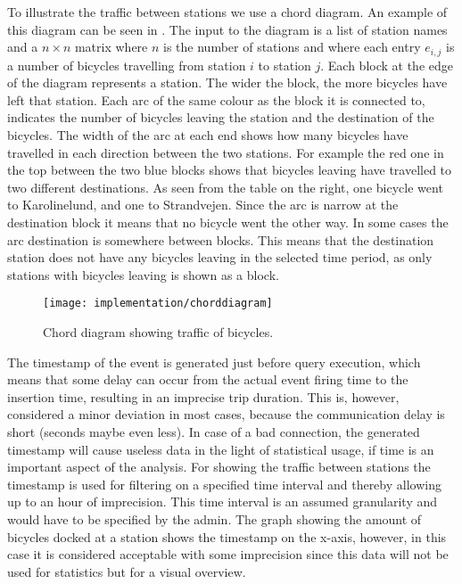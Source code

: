 To illustrate the traffic between stations we use a chord diagram. 
An example of this diagram can be seen in . 
The input to the diagram is a list of station names and a $n \times n$ matrix where $n$ is the number of stations and where each entry $e_{i,j}$ is a number of bicycles travelling from station $i$ to station $j$. 
Each block at the edge of the diagram represents a station. 
The wider the block, the more bicycles have left that station. 
Each arc of the same colour as the block it is connected to, indicates the number of bicycles leaving the station and the destination of the bicycles. 
The width of the arc at each end shows how many bicycles have travelled in each direction between the two stations. 
For example the red one in the top between the two blue blocks shows that bicycles leaving have travelled to two different destinations. 
As seen from the table on the right, one bicycle went to Karolinelund, and one to Strandvejen. 
Since the arc is narrow at the destination block it means that no bicycle went the other way. 
In some cases the arc destination is somewhere between blocks. 
This means that the destination station does not have any bicycles leaving in the selected time period, as only stations with bicycles leaving is shown as a block.
\begin{figure}[h]
\texttt{[image: implementation/chorddiagram]}
\caption{Chord diagram showing traffic of bicycles.}\label{fig:chorddiagram}
\end{figure}

The timestamp of the event is generated just before query execution, which means that some delay can occur from the actual event firing time to the insertion time, resulting in an imprecise trip duration. 
This is, however, considered a minor deviation in most cases, because the communication delay is short (seconds maybe even less).
In case of a bad connection, the generated timestamp will cause useless data in the light of statistical usage, if time is an important aspect of the analysis.
For showing the traffic between stations the timestamp is used for filtering on a specified time interval and thereby allowing up to an hour of imprecision.
This time interval is an assumed granularity and would have to be specified by the admin.
The graph showing the amount of bicycles docked at a station shows the timestamp on the x-axis, however, in this case it is considered acceptable with some imprecision since this data will not be used for statistics but for a visual overview.